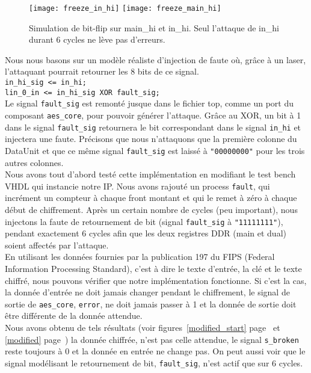 \begin{figure}[!h]
	\begin{center}
		\texttt{[image: freeze\_in\_hi]}
		\texttt{[image: freeze\_main\_hi]}
		\caption{Simulation de bit-flip sur main\_hi et in\_hi. Seul l'attaque de in\_hi durant 6 cycles ne lève pas d'erreurs.}
		\label{fig:freeze}
	\end{center}
\end{figure}

Nous nous basons sur un modèle réaliste d'injection de faute où, 
grâce à un laser, l'attaquant pourrait retourner les 8 bits de ce signal.\\
\texttt{in\_hi\_sig <= in\_hi;\\  lin\_0\_in <= in\_hi\_sig XOR fault\_sig;} \\
Le signal \texttt{fault\_sig} est remonté jusque dans le fichier top, comme un
port du composant \texttt{aes\_core}, pour pouvoir générer l'attaque.
Grâce au XOR, un bit à 1 dans le signal \texttt{fault\_sig} retournera le bit 
correspondant dans le signal \texttt{in\_hi} et injectera une faute.
Précisons que nous n'attaquons que la première colonne du DataUnit et que ce
même signal \texttt{fault\_sig} est laissé à \texttt{"00000000"} pour les trois
autres colonnes. \\
Nous avons tout d'abord testé cette implémentation en modifiant le test bench
VHDL qui instancie notre IP. Nous avons rajouté un process \texttt{fault},
qui incrément un compteur à chaque front montant et qui le remet à zéro à
chaque début de chiffrement. Après un certain nombre de cycles (peu important), nous injectons
la faute de retournement de bit (signal \texttt{fault\_sig} à
\texttt{"11111111"}), pendant exactement 6 cycles afin que les deux 
registres DDR (main et dual) soient affectés par l'attaque. \\
En utilisant les données fournies par la publication 197 du FIPS (Federal
Information Processing Standard), c'est à dire le texte d'entrée, 
la clé et le texte chiffré, nous pouvons vérifier que notre implémentation fonctionne. 
Si c'est la cas, la donnée d'entrée ne doit jamais changer pendant le chiffrement, le signal
de sortie de \texttt{aes\_core}, \texttt{error}, ne doit jamais passer à 1 et
la donnée de sortie doit être différente de la donnée attendue. \\
Nous avons obtenu de tels résultats (voir figures~\ref{modified_start} page~\pageref{modified_start} et
\ref{modified} page~\pageref{modified}) la donnée chiffrée, n'est pas celle attendue, le signal
\texttt{s\_broken} reste toujours à 0 et la donnée en entrée ne change pas. On
peut aussi voir que le signal modélisant le retournement de bit, \texttt{fault\_sig},
n'est actif que sur 6 cycles.

